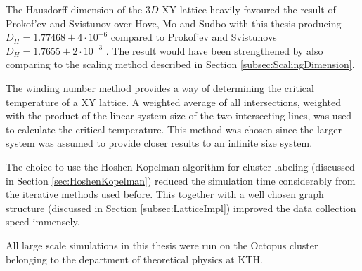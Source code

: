 The Hausdorff dimension of the $3D$ XY lattice heavily favoured the result of Prokof'ev and Svistunov over Hove, Mo and Sudbo with this thesis producing $D_H = 1.77468 \pm 4 \cdot 10^{-6}$ compared to Prokof'ev and Svistunovs $D_H = 1.7655 \pm 2 \cdot 10^{-3}$ \cite{Prokofev:comment_on_hove_hausdorff_crit_fluct}. The result would have been strengthened by also comparing to the scaling method described in Section \ref{subsec:ScalingDimension}.

The winding number method provides a way of determining the critical temperature of a XY lattice. A weighted average of all intersections, weighted with the product of the linear system size of the two intersecting lines, was used to calculate the critical temperature. This method was chosen since the larger system was assumed to provide closer results to an infinite size system.

The choice to use the Hoshen Kopelman algorithm for cluster labeling (discussed in Section \ref{sec:HoshenKopelman}) reduced the simulation time considerably from the iterative methods used before. This together with a well chosen graph structure (discussed in Section \ref{subsec:LatticeImpl}) improved the data collection speed immensely.

All large scale simulations in this thesis were run on the Octopus cluster belonging to the department of theoretical physics at KTH.



